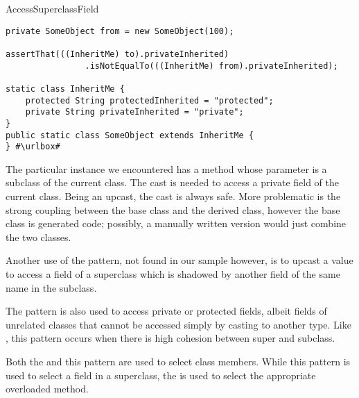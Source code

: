 \begin{pattern}{AccessSuperclassField}
\def\urlvar{http://bit.ly/mockito_mockito_2vF51Em}
\begin{listing}
\begin{verbatim}
private SomeObject from = new SomeObject(100);

assertThat(((InheritMe) to).privateInherited)
				.isNotEqualTo(((InheritMe) from).privateInherited);

static class InheritMe {
	protected String protectedInherited = "protected";
	private String privateInherited = "private";
}
public static class SomeObject extends InheritMe {
} #\urlbox#
\end{verbatim}
\end{listing}


\issues{}
The particular instance we encountered has a method whose parameter is a subclass of the current class.
The cast is needed to access a private field of the current class.
Being an upcast, the cast is always safe.
More problematic is the strong coupling between the base class and the derived class,
however the base class is generated code;
possibly, a manually written version would just combine the two classes.

Another use of the pattern, not found in our sample however,
is to upcast a value to access a field of a superclass which is shadowed by another field of the same name in the subclass.

The  pattern is also used to access private or protected fields,
albeit fields of unrelated classes that cannot be accessed simply by casting to another type.
Like ,
this pattern occurs when there is high cohesion between super and subclass.

Both the  and this pattern are used to select class members.
While this pattern is used to select a field in a superclass,
the  is used to select the appropriate overloaded method.

\end{pattern}
